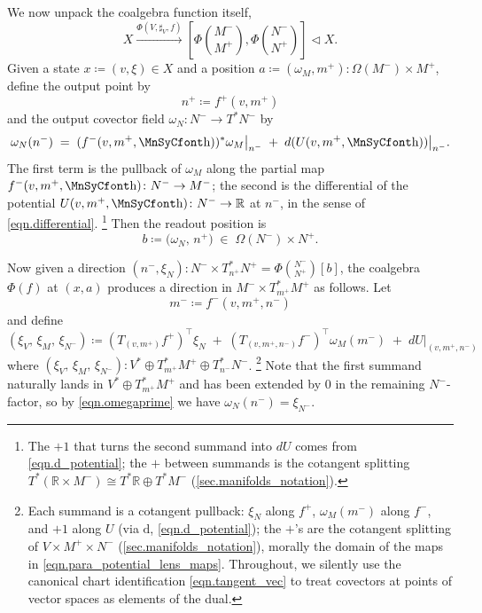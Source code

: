 \documentclass[11pt, oneside, article]{memoir}
\theoremstyle{definition}
\theoremstyle{plain}
\newcommand{\fun}[1]{\mathrm{#1}}%
\newcommand{\To}[2][]{\xrightarrow[#1]{#2}}
\newcommand{\rr}{\mathbb{R}}
\newcommand{\tri}{\mathbin{\triangleleft}}
\newcommand{\inpt}[1]{#1^{-}}
\newcommand{\outp}[1]{#1^{+}}
\newcommand{\lensob}[1]{\binom{\inpt{#1}}{\outp{#1}}}%
\newcommand{\potd}{\fun{d}}
\newcommand{\smallsquare}{\mbox{\MnSyCfont\symbol{"68}}}
\newcommand{\blank}{\mathord{\smallsquare}}
\begin{document}
We now unpack the coalgebra function itself,
\[
X\To{\Phi(V,\sharp_V,f)}
\left[\Phi\lensob M,\Phi\lensob N\right]\tri X.
\]
Given a state $x\coloneqq(v,\xi)\in X$ and a position $a\coloneqq(\omega_M,\outp m):\Omega(\inpt M)\times\outp M$, define the output point by
\begin{equation}\label{eqn.outpn}
\outp n\coloneqq\outp f(v,\outp m)
\end{equation}
and the output covector field $\omega_N\colon\inpt N\to T^*\inpt N$ by
\begin{equation}\label{eqn.omegaprime}
\omega_N(\inpt n)\;=\;(\inpt f(v,\outp m,\blank))^*\omega_M\big|_{\inpt n}\;+\;d(U(v,\outp m,\blank))\big|_{\inpt n}.
\end{equation}
The first term is the pullback of $\omega_M$ along the partial map $\inpt f(v,\outp m,\blank)\colon\inpt N\to\inpt M$; the second is the differential of the potential $U(v,\outp m,\blank)\colon\inpt N\to\rr$ at $\inpt n$, in the sense of \eqref{eqn.differential}.%
\footnote{The $+1$ that turns the second summand into $dU$ comes from \eqref{eqn.d_potential}; the $+$ between summands is the cotangent splitting $T^*(\rr\times\inpt M)\cong T^*\rr\oplus T^*\inpt M$ (\cref{sec.manifolds_notation}).} Then the readout position is
\[
b\coloneqq\bigl(\omega_N,\,\outp n\bigr)\;\in\;\Omega(\inpt N)\times\outp N.
\]


Now given a direction $(\inpt n,\xi_N):\inpt N\times T^*_{\outp n}\outp N=\Phi\lensob N[b]$, the coalgebra $\Phi(f)$ at $(x,a)$ produces a direction in $\inpt M\times T^*_{\outp m}\outp M$ as follows. Let
\begin{equation}\label{eqn.inptm}
\inpt m\coloneqq\inpt f(v,\outp m,\inpt n)
\end{equation}
and define
\begin{equation}\label{eqn.bigtheta}
(\xi_V,\,\xi_M,\,\xi_{\inpt N})\coloneqq (T_{(v,\outp m)}\outp f)^\top\xi_N \;+\; (T_{(v,\outp m,\inpt n)}\inpt f)^\top\omega_M(\inpt m) \;+\; dU\big|_{(v,\outp m,\inpt n)}\;
\end{equation}
where $(\xi_V,\,\xi_M,\,\xi_{\inpt N}):V^*\oplus T^*_{\outp m}\outp M\oplus T^*_{\inpt n}\inpt N$.%
\footnote{Each summand is a cotangent pullback: $\xi_N$ along $\outp f$, $\omega_M(\inpt m)$ along $\inpt f$, and $+1$ along $U$ (via $\potd$, \eqref{eqn.d_potential}); the $+$'s are the cotangent splitting of $V\times\outp M\times\inpt N$ (\cref{sec.manifolds_notation}), morally the domain of the maps in \eqref{eqn.para_potential_lens_maps}. Throughout, we silently use the canonical chart identification \eqref{eqn.tangent_vec} to treat covectors at points of vector spaces as elements of the dual.}
Note that the first summand naturally lands in $V^*\oplus T^*_{\outp m}\outp M$ and has been extended by $0$ in the remaining $\inpt N$-factor, so by \eqref{eqn.omegaprime} we have $\omega_N(\inpt n)=\xi_{\inpt N}$.
\end{document}
